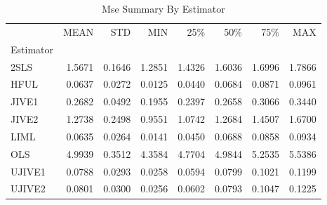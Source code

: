 \begin{table}[ht]
\centering
\caption{Mse Summary By Estimator}
\begin{tabular}{lrrrrrrr}
\toprule
 & MEAN & STD & MIN & 25\% & 50\% & 75\% & MAX \\
Estimator &  &  &  &  &  &  &  \\
\midrule
2SLS & 1.5671 & 0.1646 & 1.2851 & 1.4326 & 1.6036 & 1.6996 & 1.7866 \\
HFUL & 0.0637 & 0.0272 & 0.0125 & 0.0440 & 0.0684 & 0.0871 & 0.0961 \\
JIVE1 & 0.2682 & 0.0492 & 0.1955 & 0.2397 & 0.2658 & 0.3066 & 0.3440 \\
JIVE2 & 1.2738 & 0.2498 & 0.9551 & 1.0742 & 1.2684 & 1.4507 & 1.6700 \\
LIML & 0.0635 & 0.0264 & 0.0141 & 0.0450 & 0.0688 & 0.0858 & 0.0934 \\
OLS & 4.9939 & 0.3512 & 4.3584 & 4.7704 & 4.9844 & 5.2535 & 5.5386 \\
UJIVE1 & 0.0788 & 0.0293 & 0.0258 & 0.0594 & 0.0799 & 0.1021 & 0.1199 \\
UJIVE2 & 0.0801 & 0.0300 & 0.0256 & 0.0602 & 0.0793 & 0.1047 & 0.1225 \\
\bottomrule
\end{tabular}
\end{table}
